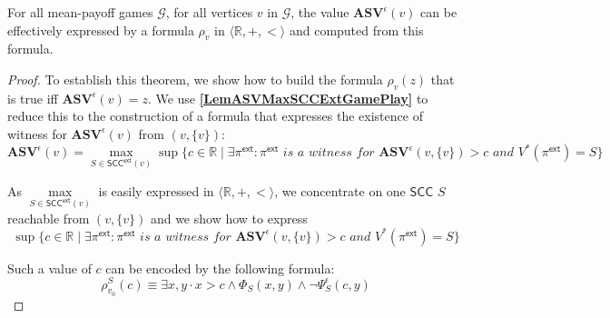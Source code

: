 \begin{theorem}
\label{ThmComputeASV}
For all mean-payoff games $\mathcal{G}$, for all vertices $v$ in $\mathcal{G}$, the value $\mathbf{ASV}^{\epsilon}(v)$ can be effectively expressed by a formula $\rho_v$ in $\langle \mathbb{R}, +, < \rangle$ and computed from this formula.
\end{theorem}
\begin{proof}
\noindent To establish this theorem, we show how to build the formula $\rho_v(z)$ that is true iff $\mathbf{ASV}^{\epsilon}(v) = z$. We use \textbf{\cref{LemASVMaxSCCExtGamePlay}} to reduce this to the construction of a formula that expresses the existence of witness for $\mathbf{ASV}^{\epsilon}(v)$ from $(v, \{v\})$:
 \begin{equation*}
     \mathbf{ASV}^{\epsilon}(v) = \max \limits_{S \in \mathsf{SCC}^{\mathsf{ext}}(v)} \sup \{c \in \mathbb{R} \mid \exists \pi^{\mathsf{ext}}: \pi^{\mathsf{ext}} \textit{ is a witness for } \mathbf{ASV}^{\epsilon}(v, \{v\}) > c \textit{ and } V^{*}(\pi^{\mathsf{ext}}) = S \}
 \end{equation*}
 
\noindent As $\max \limits_{S \in \mathsf{SCC}^{\mathsf{ext}}(v)}$ is easily expressed in $\langle \mathbb{R}, +, < \rangle$, we concentrate on one $\mathsf{SCC}$ $S$ reachable from $(v, \{v\})$ and we show how to express
 \begin{equation*}
     \sup \{ c \in \mathbb{R} \mid \exists \pi^{\mathsf{ext}}: \pi^{\mathsf{ext}} \textit{ is a witness for } \mathbf{ASV}^{\epsilon}(v, \{v\}) > c \textit{ and } V^{*}(\pi^{\mathsf{ext}}) = S \}
 \end{equation*}

\noindent Such a value of $c$ can be encoded by the following formula:
\begin{equation*}
    \rho^S_{v_0}(c) \equiv \exists x,y \cdot x > c \land \Phi_S(x,y) \land \neg \Psi_S^{\epsilon}(c, y)
\end{equation*}


\end{proof}

